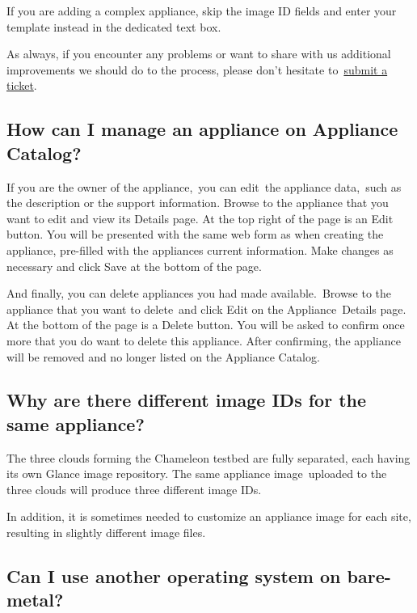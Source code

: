 If you are adding a complex appliance, skip the image ID fields and
enter your template instead in the dedicated text box.

As always, if you encounter any problems or want to share with us
additional improvements we should do to the process, please don't
hesitate to~\href{https://www.chameleoncloud.org/help/}{submit a
ticket}.~

\subsection{How can I manage an appliance on Appliance
Catalog?}\label{how-can-i-manage-an-appliance-on-chameleon-appliance-catalog}

If you are the owner of the appliance,~you can edit~the appliance
data,~such as the description or the support information. Browse to the
appliance that you want to edit and view its Details page. At the top
right of the page is an Edit button. You will be presented with the same
web form as when creating the appliance, pre-filled with the appliances
current information. Make changes as necessary and click Save at the
bottom of the page.

And finally, you can delete appliances you had made available.~{Browse
to the appliance that you want to delete~and click Edit on the
Appliance~Details page. At the bottom of the page is a Delete button.
You will be asked to confirm once more that you do want to delete this
appliance}. After confirming, the appliance will be removed and no
longer listed on the Appliance Catalog.

\subsection{Why are there different image IDs  for the same
appliance?}\label{why-are-there-different-image-ids-for-kvmtacc-chitacc-and-chiuc-for-the-same-appliance}

The three clouds forming the Chameleon testbed are fully separated, each
having its own Glance image repository. The same appliance
image~uploaded to the three clouds will produce three different image
IDs.

In addition, it is sometimes needed to customize an appliance image for
each site, resulting in slightly different image files.

\subsection{Can I use another operating system on bare-metal?}\label{can-i-useubuntudebian-oranother-operating-system-rather-than-centos-on-bare-metal}

